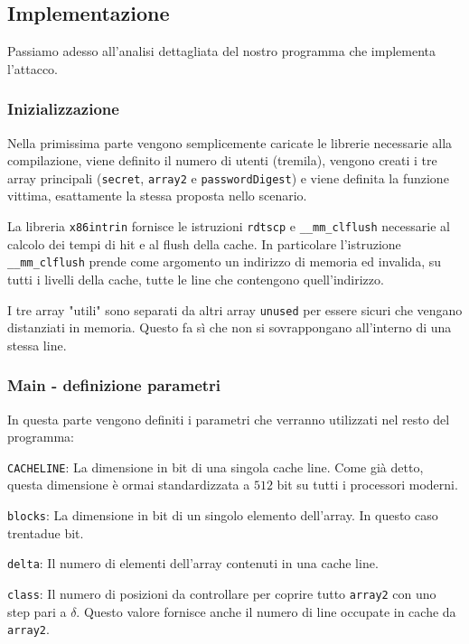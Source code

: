 			\subsection{Implementazione}
				Passiamo adesso all'analisi dettagliata del nostro programma che implementa l'attacco.
				
				\subsubsection{Inizializzazione}
				
				Nella primissima parte vengono semplicemente caricate le librerie necessarie alla compilazione, viene definito il numero di utenti (tremila), vengono creati i tre array principali (\texttt{secret}, \texttt{array2} e \texttt{passwordDigest}) e viene definita la funzione vittima, esattamente la stessa proposta nello scenario.
				
 				La libreria \texttt{x86intrin} fornisce le istruzioni \texttt{rdtscp} e \texttt{\_\_mm\_clflush} necessarie al calcolo dei tempi di hit e al flush della cache. In particolare l'istruzione \texttt{\_\_mm\_clflush} prende come argomento un indirizzo di memoria ed invalida, su tutti i livelli della cache, tutte le line che contengono quell'indirizzo.
				
				I tre array "utili" sono separati da altri array \texttt{unused} per essere sicuri che vengano distanziati in memoria. Questo fa sì che non si sovrappongano all'interno di una stessa line.
				
				\subsubsection{Main - definizione parametri}
				
				In questa parte vengono definiti i parametri che verranno utilizzati nel resto del programma:

					\texttt{CACHELINE}: La dimensione in bit di una singola cache line. Come già detto, questa dimensione è ormai standardizzata a $512$ bit su tutti i processori moderni.
					
					\texttt{blocks}: La dimensione in bit di un singolo elemento dell'array. In questo caso trentadue bit.
					
					\texttt{delta}: Il numero di elementi dell'array contenuti in una cache line.
					
					\texttt{class}: Il numero di posizioni da controllare per coprire tutto \texttt{array2} con uno step pari a $\delta$. Questo valore fornisce anche il numero di line occupate in cache da \texttt{array2}.
					
